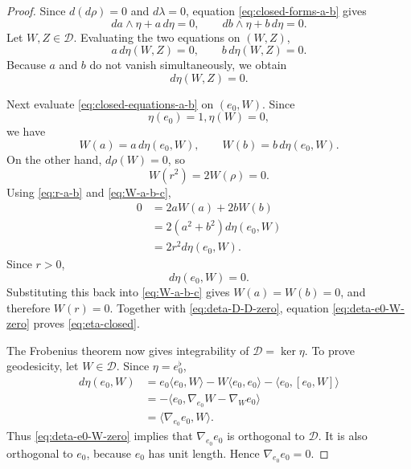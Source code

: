 \documentclass[11pt,a4paper]{article}
\numberwithin{equation}{section}
\newcommand{\Dcal}{\mathcal D}
\begin{document}
\begin{proof}
Since $d(d\rho)=0$ and $d\lambda=0$, equation \eqref{eq:closed-forms-a-b} gives
\begin{equation}\label{eq:closed-equations-a-b}
        da\wedge\eta+a\,d\eta=0,
        \qquad
        db\wedge\eta+b\,d\eta=0.
\end{equation}
Let $W,Z\in\Dcal$.  Evaluating the two equations on $(W,Z)$,
$$
        a\,d\eta(W,Z)=0,
        \qquad
        b\,d\eta(W,Z)=0.
$$
Because $a$ and $b$ do not vanish simultaneously, we obtain
\begin{equation}\label{eq:deta-D-D-zero}
        d\eta(W,Z)=0.
\end{equation}

Next evaluate \eqref{eq:closed-equations-a-b} on $(e_0,W)$.  Since $$\eta(e_0)=1, \eta(W)=0,$$
we have
\begin{equation}\label{eq:W-a-b-c}
        W(a)=a\,d\eta(e_0,W),
        \qquad
        W(b)=b\,d\eta(e_0,W).
\end{equation}
On the other hand, $d\rho(W)=0$, so
$$
        W(r^2)=2W(\rho)=0.
$$
Using \eqref{eq:r-a-b} and \eqref{eq:W-a-b-c},
$$
\begin{aligned}
        0
        &=2aW(a)+2bW(b)\\
        &=2(a^2+b^2)d\eta(e_0,W)\\
        &=2r^2d\eta(e_0,W).
\end{aligned}
$$
Since $r>0$,
\begin{equation}\label{eq:deta-e0-W-zero}
        d\eta(e_0,W)=0.
\end{equation}
Substituting this back into \eqref{eq:W-a-b-c} gives $W(a)=W(b)=0$, and therefore $W(r)=0$.  Together with \eqref{eq:deta-D-D-zero}, equation \eqref{eq:deta-e0-W-zero} proves \eqref{eq:eta-closed}.

The Frobenius theorem now gives integrability of $\Dcal=\ker\eta$.  To prove geodesicity, let $W\in\Dcal$.  Since $\eta=e_0^\flat$,
$$
\begin{aligned}
        d\eta(e_0,W)
        &=e_0\langle e_0,W\rangle
          -W\langle e_0,e_0\rangle
          -\langle e_0,[e_0,W]\rangle\\
        &=-\langle e_0,\nabla_{e_0}W-\nabla_We_0\rangle\\
        &=\langle\nabla_{e_0}e_0,W\rangle.
\end{aligned}
$$
Thus \eqref{eq:deta-e0-W-zero} implies that $\nabla_{e_0}e_0$ is orthogonal to $\Dcal$.  It is also orthogonal to $e_0$, because $e_0$ has unit length.  Hence $\nabla_{e_0}e_0=0$.
\end{proof}
\end{document}
